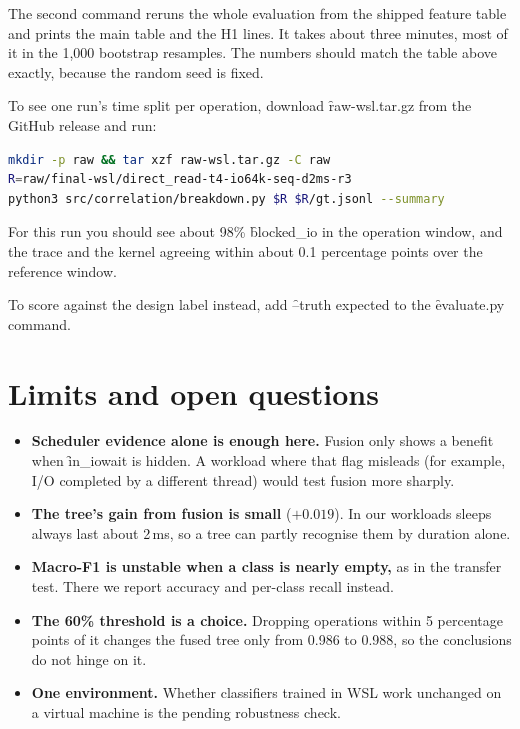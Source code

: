 \documentclass[11pt]{article}
\begin{document}
The second command reruns the whole evaluation from the shipped feature table and prints the main table and the H1 lines. It takes about three minutes, most of it in the 1{,}000 bootstrap resamples. The numbers should match the table above exactly, because the random seed is fixed.

To see one run's time split per operation, download \f{raw-wsl.tar.gz} from the GitHub release and run:

\begin{lstlisting}[language=bash]
mkdir -p raw && tar xzf raw-wsl.tar.gz -C raw
R=raw/final-wsl/direct_read-t4-io64k-seq-d2ms-r3
python3 src/correlation/breakdown.py $R $R/gt.jsonl --summary
\end{lstlisting}

For this run you should see about 98\% \f{blocked\_io} in the operation window, and the trace and the kernel agreeing within about 0.1 percentage points over the reference window.

To score against the design label instead, add \f{--truth expected} to the \f{evaluate.py} command.

\section{Limits and open questions}

\begin{itemize}
\item \textbf{Scheduler evidence alone is enough here.} Fusion only shows a benefit when \f{in\_iowait} is hidden. A workload where that flag misleads (for example, I/O completed by a different thread) would test fusion more sharply.
\item \textbf{The tree's gain from fusion is small} ($+0.019$). In our workloads sleeps always last about 2\,ms, so a tree can partly recognise them by duration alone.
\item \textbf{Macro-F1 is unstable when a class is nearly empty,} as in the transfer test. There we report accuracy and per-class recall instead.
\item \textbf{The 60\% threshold is a choice.} Dropping operations within 5 percentage points of it changes the fused tree only from 0.986 to 0.988, so the conclusions do not hinge on it.
\item \textbf{One environment.} Whether classifiers trained in WSL work unchanged on a virtual machine is the pending robustness check.
\end{itemize}
\end{document}
